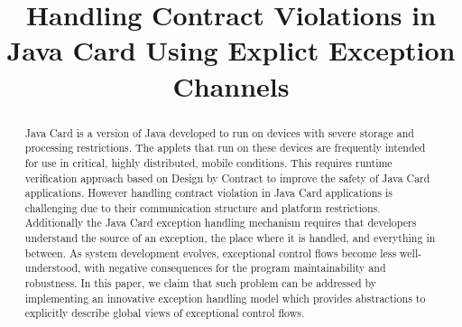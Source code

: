 \documentclass[10pt, conference, compsocconf]{IEEEtran}
\begin{document}
%
\title{Handling Contract Violations in Java Card Using Explict Exception Channels}



\author{ 
\and

}



\maketitle


\begin{abstract}
Java Card is a version of Java developed to run on devices with severe storage and processing restrictions. The applets that run on these devices are frequently intended for use in critical, highly distributed, mobile conditions. This requires runtime verification approach based on Design by Contract to improve the safety of Java Card applications. However handling contract violation in Java Card applications is challenging due to their communication structure and platform restrictions. Additionally the Java Card exception handling mechanism requires that developers understand the source of an exception, the place where it is handled, and everything in between. As system development evolves, exceptional control flows become less well-understood, with negative consequences for the program maintainability and robustness. In this paper, we claim that such problem can be addressed by implementing an innovative exception handling model which provides abstractions to explicitly describe global views of exceptional control flows.
\end{abstract}
\end{document}
